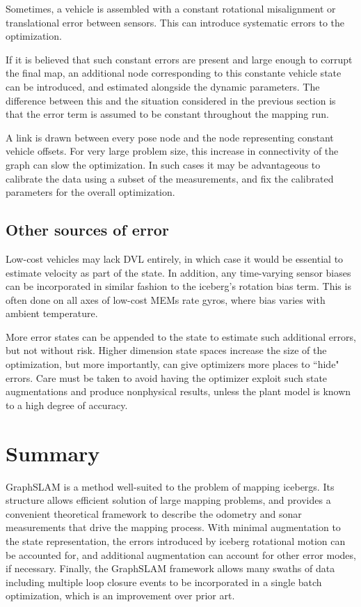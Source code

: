 Sometimes, a vehicle is assembled with a constant rotational misalignment or translational error between sensors. This can introduce systematic errors to the optimization.

If it is believed that such constant errors are present and large enough to corrupt the final map, an additional node corresponding to this constante vehicle state can be introduced, and estimated alongside the dynamic parameters. The difference between this and the situation considered in the previous section is that the error term is assumed to be constant throughout the mapping run. 

A link is drawn between every pose node and the node representing constant vehicle offsets. For very large problem size, this increase in connectivity of the graph can slow the optimization. In such cases it may be advantageous to calibrate the data using a subset of the measurements, and fix the calibrated parameters for the overall optimization. 

\subsection{Other sources of error}

Low-cost vehicles may lack DVL entirely, in which case it would be essential to estimate velocity as part of the state. In addition, any time-varying sensor biases can be incorporated in similar fashion to the iceberg's rotation bias term. This is often done on all axes of low-cost MEMs rate gyros, where bias varies with ambient temperature. 

More error states can be appended to the state to estimate such additional errors, but not without risk. Higher dimension state spaces increase the size of the optimization, but more importantly, can give optimizers more places to ``hide" errors. Care must be taken to avoid having the optimizer exploit such state augmentations and produce nonphysical results, unless the plant model is known to a high degree of accuracy.
 
\label{sec.DesignConsiderations}

\section{Summary}

GraphSLAM is a method well-suited to the problem of mapping icebergs. Its structure allows efficient solution of large mapping problems, and provides a convenient theoretical framework to describe the odometry and sonar measurements that drive the mapping process. With minimal augmentation to the state representation, the errors introduced by iceberg rotational motion can be accounted for, and additional augmentation can account for other error modes, if necessary. Finally, the GraphSLAM framework allows many swaths of data including multiple loop closure events to be incorporated in a single batch optimization, which is an improvement over prior art.
